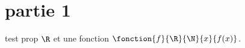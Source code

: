 \section{partie 1}

\begin{propriete}{test prop}{}
    $\R$ et une fonction $\fonction{f}{\R}{\N}{x}{f(x)}$.
\end{propriete}

